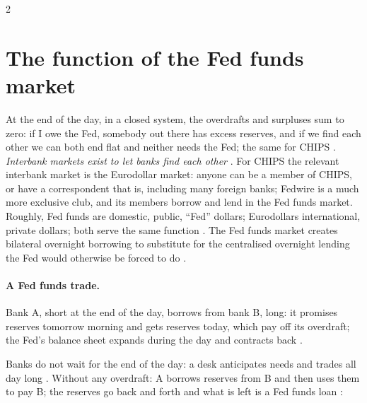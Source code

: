 \begin{paracol}{2}
\section{The function of the Fed funds market}\label{sec:ff-function}

At the end of the day, in a closed system, the overdrafts and surpluses sum to zero: if I owe the Fed, somebody out there has excess reserves, and if we
find each other we can both end flat and neither needs the Fed; the same for CHIPS . \emph{Interbank markets exist to let
banks find each other} . For CHIPS the relevant interbank market is the Eurodollar market: anyone can be a member of CHIPS, or have a
correspondent that is, including many foreign banks; Fedwire is a much more exclusive club, and its members borrow and lend in the Fed funds market.
Roughly, Fed funds are domestic, public, ``Fed'' dollars; Eurodollars international, private dollars; both serve the same function
. The Fed funds market creates bilateral overnight borrowing to substitute for the centralised overnight lending the Fed would
otherwise be forced to do .

\paragraph{A Fed funds trade.} Bank A, short at the end of the day, borrows from bank B, long: it promises reserves tomorrow morning and gets reserves today,
which pay off its overdraft; the Fed's balance sheet expands during the day and contracts back .
\begin{taccts}
\qquad
{}
\end{taccts}
Banks do not wait for the end of the day: a desk anticipates needs and trades all day long . Without any overdraft: A borrows reserves
from B and then uses them to pay B; the reserves go back and forth and what is left is a Fed funds loan :
\begin{taccts}
\qquad
{}
\end{taccts}


\end{paracol}
